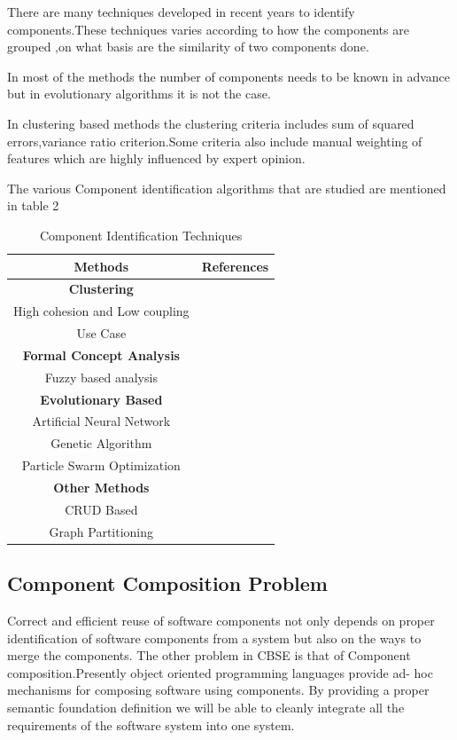 \documentclass[12pt]{article}
\begin{document}
There are many techniques developed in recent years to identify components.These techniques varies according to how the components are grouped ,on what basis are the similarity of two components done\cite{9497978}.

In most of the methods the number of components needs to be known in advance but in evolutionary algorithms it is not the case.

In clustering based methods the clustering criteria includes sum of squared errors,variance ratio criterion.Some criteria also include manual weighting of features which are highly influenced by expert opinion.

The various Component identification algorithms that are studied are mentioned in table 2
\begin{table}
	\caption{Component Identification Techniques}
	\begin{center}
		\begin{tabular}{||c c ||} 
			\hline
			Methods & References  \\ [0.5ex] 
			\hline\hline
			\textbf{Clustering}& \\
			\hline
			High cohesion and Low coupling & \cite{highCohesionLowCoupling}  \\ 
			\hline
			Use Case & \cite{useCase} \\
			\hline
			\textbf{Formal Concept Analysis} &   \\ [1ex]
			\hline
			Fuzzy based analysis & \cite{fuzzy}  \\ [1ex]
			\hline
			\textbf{Evolutionary Based} &   \\ [1ex]
			\hline
			Artificial Neural Network  & \cite{neural} \\
			\hline
			Genetic Algorithm & \cite{genetic}  \\
			\hline
			Particle Swarm Optimization & \cite{pso}  \\ [1ex] 
			\hline
			\textbf{Other Methods} &   \\ [1ex]
			\hline
			CRUD Based & \cite{CRUD}  \\ [1ex]
			\hline
			Graph Partitioning & \cite{graphPartion}  \\ [1ex]
			\hline
		\end{tabular}
	\end{center}
\end{table}
\subsection{Component Composition Problem}
Correct and efficient reuse of software components not only depends on proper identification of software components from a system but also on the ways to merge the components. The other problem in CBSE is that of Component composition.Presently object oriented programming languages provide ad- hoc mechanisms for composing software using components. By providing a proper semantic foundation definition we will be able to cleanly integrate all the requirements of the software system into one system\cite{softwareComposition}.
\end{document}
